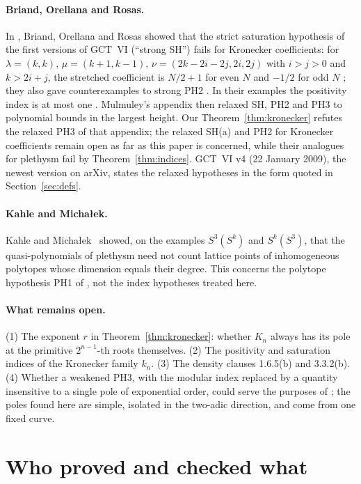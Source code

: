 \paragraph{Briand, Orellana and Rosas.}
In \cite{BOR}, Briand, Orellana and Rosas showed that the strict saturation
hypothesis of the first versions of GCT~VI (``strong SH'') fails for Kronecker
coefficients: for $\lambda=(k,k)$, $\mu=(k+1,k-1)$, $\nu=(2k-2i-2j,2i,2j)$
with $i>j>0$ and $k>2i+j$, the stretched coefficient is $N/2+1$ for even $N$
and $-1/2$ for odd $N$ \cite[Theorem 2.4, p.~7]{BOR}; they also gave
counterexamples to strong PH2 \cite[Section 2.4, p.~8]{BOR}. In their examples
the positivity index is at most one \cite[Section 2.5, p.~8]{BOR}. Mulmuley's
appendix \cite[pp.~18--20]{BOR} then relaxed SH, PH2 and PH3 to polynomial
bounds in the largest height. Our Theorem~\ref{thm:kronecker} refutes the
relaxed PH3 of that appendix; the relaxed SH(a) and PH2 for Kronecker
coefficients remain open as far as this paper is concerned, while their
analogues for plethysm fail by Theorem~\ref{thm:indices}. GCT~VI v4 (22 January
2009), the newest version on arXiv, states the relaxed hypotheses in the form
quoted in Section~\ref{sec:defs}.

\paragraph{Kahle and Micha\l{}ek.}
Kahle and Micha\l{}ek~\cite{KM} showed, on the examples $S^3(S^k)$ and
$S^k(S^3)$, that the quasi-polynomials of plethysm need not count lattice points
of inhomogeneous polytopes whose dimension equals their degree. This concerns
the polytope hypothesis PH1 of \cite{GCT6}, not the index hypotheses treated
here.

\paragraph{What remains open.}
(1) The exponent $r$ in Theorem~\ref{thm:kronecker}: whether $K_n$ always has
its pole at the primitive $2^{n-1}$-th roots themselves. (2) The positivity and
saturation indices of the Kronecker family $k_n$. (3) The density clauses
1.6.5(b) and 3.3.2(b). (4) Whether a weakened PH3, with the modular index
replaced by a quantity insensitive to a single pole of exponential order, could
serve the purposes of \cite{GCT6}; the poles found here are simple, isolated in
the two-adic direction, and come from one fixed curve.

\section{Who proved and checked what}\label{sec:provenance}

